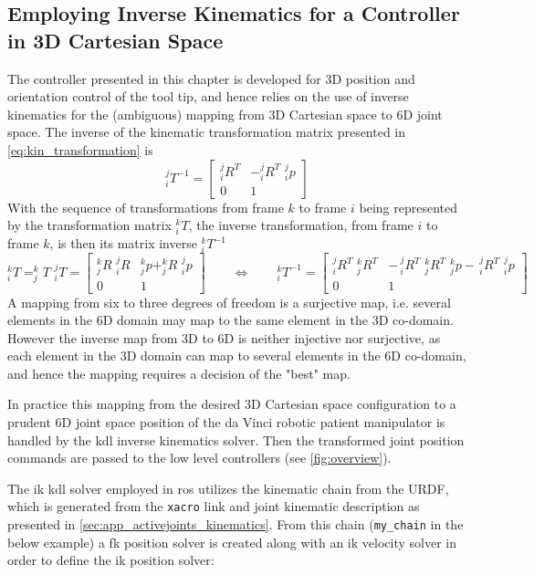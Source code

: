 \subsection{Employing Inverse Kinematics for a Controller in 3D Cartesian Space}
The controller presented in this chapter is developed for 3D position and orientation control of the tool tip, and hence relies on the use of inverse kinematics for the (ambiguous) mapping from 3D Cartesian space to 6D joint space. The inverse of the kinematic transformation matrix presented in \autoref{eq:kin_transformation} is
\begin{equation}
^j_iT^{-1} = 
\begin{bmatrix}
^j_iR^T & -^j_iR^T\,\,^j_ip\\
0 & 1
\end{bmatrix}
\end{equation}
With the sequence of transformations from frame $k$ to frame $i$ being represented by the transformation matrix $^k_i T$, the inverse transformation, from frame $i$ to frame $k$, is then its matrix inverse $^k_i T^{-1}$
\begin{equation}
^k_iT = ^k_jT \,\, ^j_iT =
\begin{bmatrix}
^k_jR \,\, ^j_iR & ^k_jp+^k_jR \,\, ^j_ip\\
0 & 1
\end{bmatrix}
\qquad \Leftrightarrow \qquad
^k_iT^{-1} = 
\begin{bmatrix}
^j_iR^T\,\, ^k_jR^T & -\,^j_iR^T\,\, ^k_jR^T\,\,^k_jp -\, ^j_iR^T\,\, ^j_ip\\
0 & 1
\end{bmatrix}
\end{equation}
A mapping from six to three degrees of freedom is a surjective map, i.e. several elements in the 6D domain may map to the same element in the 3D co-domain. However the inverse map from 3D to 6D is neither injective nor surjective, as each element in the 3D domain can map to several elements in the 6D co-domain, and hence the mapping requires a decision of the "best" map.

In practice this mapping from the desired 3D Cartesian space configuration to a prudent 6D joint space position of the da Vinci robotic patient manipulator is handled by the \gls{kdl} inverse kinematics solver. Then the transformed joint position commands are passed to the low level controllers (see \autoref{fig:overview}).

The \gls{ik} \gls{kdl} solver employed in \gls{ros} utilizes the kinematic chain from the URDF, which is generated from the \texttt{xacro} link and joint kinematic description as presented in %
\autoref{sec:app_activejoints_kinematics}. From this chain (\texttt{my\_chain} in the below example) a \gls{fk} position solver is created along with an \gls{ik} velocity solver in order to define the \gls{ik} position solver:


